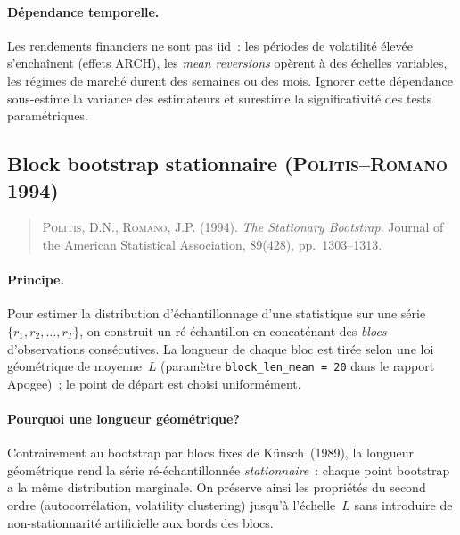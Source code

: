 \paragraph{Dépendance temporelle.} Les rendements financiers ne sont pas iid~: les périodes de volatilité élevée s'enchaînent (effets ARCH), les \emph{mean reversions} opèrent à des échelles variables, les régimes de marché durent des semaines ou des mois. Ignorer cette dépendance sous-estime la variance des estimateurs et surestime la significativité des tests paramétriques.

\subsection{Block bootstrap stationnaire (\textsc{Politis--Romano} 1994)}
\label{app:politis_romano}

\begin{quote}\small
\textsc{Politis}, D.N., \textsc{Romano}, J.P. (1994). \emph{The Stationary Bootstrap}. Journal of the American Statistical Association, 89(428), pp.~1303--1313.
\end{quote}

\paragraph{Principe.} Pour estimer la distribution d'échantillonnage d'une statistique sur une série $\{r_{1}, r_{2}, \ldots, r_{T}\}$, on construit un ré-échantillon en concaténant des \emph{blocs} d'observations consécutives. La longueur de chaque bloc est tirée selon une loi géométrique de moyenne~$L$ (paramètre \texttt{block\_len\_mean~=~20} dans le rapport Apogee)~; le point de départ est choisi uniformément.

\paragraph{Pourquoi une longueur géométrique?} Contrairement au bootstrap par blocs fixes de Künsch~(1989), la longueur géométrique rend la série ré-échantillonnée \emph{stationnaire}~: chaque point bootstrap a la même distribution marginale. On préserve ainsi les propriétés du second ordre (autocorrélation, volatility clustering) jusqu'à l'échelle~$L$ sans introduire de non-stationnarité artificielle aux bords des blocs.

